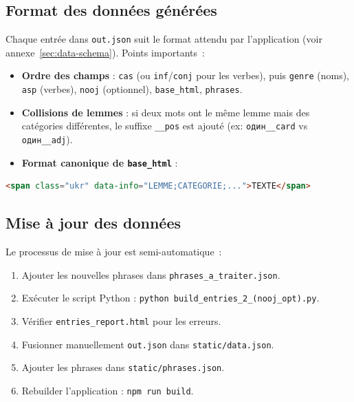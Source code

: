 \subsection{Format des données générées}

Chaque entrée dans \texttt{out.json} suit le format attendu par l'application (voir annexe~\ref{sec:data-schema}). Points importants~:

\begin{itemize}
  \item \textbf{Ordre des champs} : \texttt{cas} (ou \texttt{inf}/\texttt{conj} pour les verbes), puis \texttt{genre} (noms), \texttt{asp} (verbes), \texttt{nooj} (optionnel), \texttt{base\_html}, \texttt{phrases}.
  \item \textbf{Collisions de lemmes} : si deux mots ont le même lemme mais des catégories différentes, le suffixe \texttt{\_\_pos} est ajouté (ex: \texttt{один\_\_card} vs \texttt{один\_\_adj}).
  \item \textbf{Format canonique de \texttt{base\_html}} :
\end{itemize}

\begin{lstlisting}[language=html]
<span class="ukr" data-info="LEMME;CATEGORIE;...">TEXTE</span>
\end{lstlisting}

\subsection{Mise à jour des données}

Le processus de mise à jour est semi-automatique~:

\begin{enumerate}
  \item Ajouter les nouvelles phrases dans \texttt{phrases\_a\_traiter.json}.
  \item Exécuter le script Python : \texttt{python build\_entries\_2\_(nooj\_opt).py}.
  \item Vérifier \texttt{entries\_report.html} pour les erreurs.
  \item Fusionner manuellement \texttt{out.json} dans \texttt{static/data.json}.
  \item Ajouter les phrases dans \texttt{static/phrases.json}.
  \item Rebuilder l'application : \texttt{npm run build}.
\end{enumerate}
